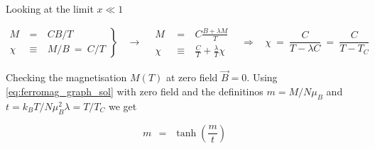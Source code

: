 \documentclass[10pt]{report}
\numberwithin{equation}{chapter}
\begin{document}




Looking at the limit $ x \ll 1$ 

\begin{equation*}
  \left.
  \begin{array}{lcr}
    M ~ & = &~ C B/T \\
    \chi ~ & \equiv &~ M/B ~=~ C/T
  \end{array} \right\} 
  ~~~~ \rightarrow ~~~~ 
  \begin{array}{lcr}
    M ~~&=& ~ C \frac{B + \lambda M}{T}\\
    \chi ~ &\equiv& ~ \frac{C}{T} + \frac{\lambda}{T} \chi
  \end{array}
  ~~~~ \Rightarrow ~~~~ 
  \chi ~=~ \frac{C}{T-\lambda C} ~=~ \frac{C}{T - T_C}
\end{equation*}


Checking the magnetisation $M(T)$ at zero field $\vec{B} = 0$. Using \ref{eq:ferromag_graph_sol} with zero field and the definitinos $m = M/N \mu_B$ and $t = k_BT/N \mu_B^2 \lambda = T/T_C$ we get

\begin{equation}
  m ~~=~~ \tanh(\frac{m}{t})
\end{equation}
\end{document}
